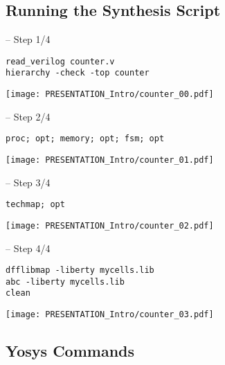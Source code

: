 
\subsection{Running the Synthesis Script}

\begin{frame}[t, fragile]{\subsecname{} -- Step 1/4}
\begin{verbatim}
read_verilog counter.v
hierarchy -check -top counter
\end{verbatim}

\vfill
\texttt{[image: PRESENTATION\_Intro/counter\_00.pdf]}
\end{frame}

\begin{frame}[t, fragile]{\subsecname{} -- Step 2/4}
\begin{verbatim}
proc; opt; memory; opt; fsm; opt
\end{verbatim}

\vfill
\texttt{[image: PRESENTATION\_Intro/counter\_01.pdf]}
\end{frame}

\begin{frame}[t, fragile]{\subsecname{} -- Step 3/4}
\begin{verbatim}
techmap; opt
\end{verbatim}

\vfill
\texttt{[image: PRESENTATION\_Intro/counter\_02.pdf]}
\end{frame}

\begin{frame}[t, fragile]{\subsecname{} -- Step 4/4}
\begin{verbatim}
dfflibmap -liberty mycells.lib
abc -liberty mycells.lib
clean
\end{verbatim}

\vfill\hfil
\texttt{[image: PRESENTATION\_Intro/counter\_03.pdf]}
\end{frame}


\subsection{Yosys Commands}

